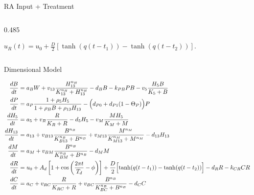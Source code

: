 \documentclass[aspectratio=169,11pt]{beamer}
\begin{document}
\begin{frame}{RA Input + Treatment}
\begin{columns}[T,totalwidth=\textwidth]
\begin{column}{0.485\textwidth}
\begin{textcard}
      \end{textcard}
      \vspace{0.30cm}
      \begin{textcard}
        \centering\vspace{0.04cm}
        $\displaystyle u_R(t)=u_0+\frac{D}{2}\left[\tanh(q(t-t_1))-\tanh(q(t-t_2))\right].$
        \vspace{0.04cm}
      \end{textcard}
    \end{column}
  \end{columns}
\end{frame}

\begin{frame}{Dimensional Model}
  \vspace{-0.34cm}
  \begin{textcard}[left=14pt,right=14pt,top=9pt,bottom=9pt]
    \setlength{\jot}{2.0pt}
    \footnotesize
    \begin{align*}
      \frac{dB}{dt}   &= a_BW+v_{13}\frac{H_{13}^{n_H}}{K_{13}^{n_H}+H_{13}^{n_H}}
                         -d_BB-k_{PB}PB-v_5\frac{H_5B}{K_5+B}\\
      \frac{dP}{dt}   &= a_P\frac{1+\rho_5H_5}{1+\rho_BB+\rho_{13}H_{13}}
                         -\Bigl(d_{P0}+d_{P1}(1-\Theta_P)\Bigr)P\\
      \frac{dH_5}{dt} &= a_5+v_R\frac{R}{K_R+R}-d_5H_5-v_M\frac{MH_5}{K_M+M}\\
      \frac{dH_{13}}{dt} &= a_{13}+v_{B13}\frac{B^{n_B}}{K_{B13}^{n_B}+B^{n_B}}
                         +v_{M13}\frac{M^{n_M}}{K_{M13}^{n_M}+M^{n_M}}-d_{13}H_{13}\\
      \frac{dM}{dt}   &= a_M+v_{BM}\frac{B^{n_B}}{K_{BM}^{n_B}+B^{n_B}}-d_MM\\
      \frac{dR}{dt}   &= u_0+A_d\left[1+\cos\left(\frac{2\pi t}{T_d}-\phi\right)\right]
                         +\frac{D}{2}\Bigl[\tanh(q(t-t_1))-\tanh(q(t-t_2))\Bigr]
                         -d_RR-k_{CR}CR\\
      \frac{dC}{dt}   &= a_C+v_{RC}\frac{R}{K_{RC}+R}
                         +v_{BC}\frac{B^{n_B}}{K_{BC}^{n_B}+B^{n_B}}-d_CC
    \end{align*}
  \end{textcard}
\end{frame}
\end{document}
